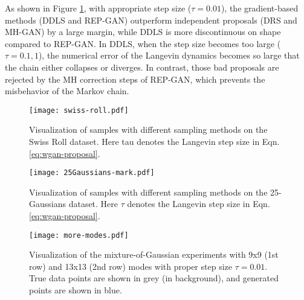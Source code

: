 \documentclass[runningheads]{llncs}
\newcommand{\<}{\left\langle}
\renewcommand{\>}{\right\rangle}
\begin{document}
As shown in Figure \ref{fig:swissroll}, with appropriate step size ($\tau=0.01$), the gradient-based methods (DDLS and REP-GAN) outperform independent proposals (DRS and MH-GAN) by a large margin, while DDLS is more discontinuous on shape compared to REP-GAN. In DDLS, when the step size becomes too large ($\tau=0.1,1$), the numerical error of the Langevin dynamics becomes so large that the chain either collapses or diverges. In contrast, those bad proposals are rejected by the MH correction steps of REP-GAN, which prevents the misbehavior of the Markov chain.


\begin{figure}[t]
    \centering
    \texttt{[image: swiss-roll.pdf]}
    \caption{Visualization of samples with different sampling methods on the Swiss Roll dataset. Here tau denotes the Langevin step size in Eqn. \eqref{eq:wgan-proposal}.}
    \label{fig:swissroll}
\end{figure}



\begin{figure}[t]
    \centering
    \texttt{[image: 25Gaussians-mark.pdf]}
    \caption{Visualization of samples with different sampling methods on the 25-Gaussians dataset. Here $\tau$ denotes the Langevin step size in Eqn. \eqref{eq:wgan-proposal}.}
    \label{fig:25gaussians}
\end{figure}

\begin{figure}[t]
    \centering
    \texttt{[image: more-modes.pdf]}
    \caption{Visualization of the mixture-of-Gaussian experiments with 9x9 (1st row) and 13x13 (2nd row) modes with proper step size $\tau=0.01$. True data points are shown in grey (in background), and generated points are shown in blue. }
    \label{fig:more-modes}
\end{figure}
\end{document}

